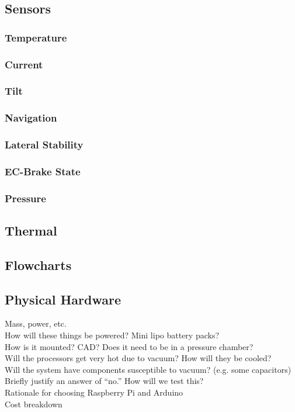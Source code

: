 \documentclass[main.tex]{subfile}
\begin{document}
    \subsection{Sensors}
    \subsubsection{Temperature}
    \subsubsection{Current}
    \subsubsection{Tilt}
    \subsubsection{Navigation}
    \subsubsection{Lateral Stability}
    \subsubsection{EC-Brake State}
    \subsubsection{Pressure}

    \subsection{Thermal}
    \subsection{Flowcharts}

    \subsection{Physical Hardware}
    Mass, power, etc.\\
    How will these things be powered? Mini lipo battery packs?\\
    How is it mounted? CAD? Does it need to be in a pressure chamber?\\
    Will the processors get very hot due to vacuum? How will they be cooled?\\
    Will the system have components susceptible to vacuum? (e.g. some capacitors) Briefly justify an answer of “no.” How will we test this?\\
    Rationale for choosing Raspberry Pi and Arduino\\
    Cost breakdown
\end{document}
